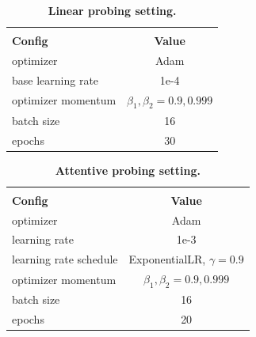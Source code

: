 \begin{table}[t]
    \caption{\textbf{Linear probing setting.}}
    \vspace{-1.5em}
    \begin{center}
    \small
        \begin{tabular}{l|c}
            \hline
            
            \hline
            
            \hline\\[-3mm]
            \textbf{Config} & \textbf{Value } \\
            \hline
            optimizer & Adam \\
            base learning rate & 1e-4 \\
            
            optimizer momentum & $\beta_1, \beta_2{=}0.9, 0.999$ \\
            batch size & 16 \\
            epochs  & 30 \\
            \hline 
            
            \hline
            
            \hline
        \end{tabular}
    \end{center}
\vspace{-1.2em}
\label{tab:hyperparams_lp}
\vspace{1.5em}
\end{table}


\begin{table}[t]
    \caption{\textbf{Attentive probing setting.}}
    \vspace{-1.5em}
    \begin{center}
    \small
        \begin{tabular}{l|c}
            \hline
            
            \hline
            
            \hline\\[-3mm]
            \textbf{Config} & \textbf{Value } \\
            \hline
            optimizer & Adam \\
            learning rate & 1e-3 \\
            learning rate schedule & ExponentialLR, $\gamma{=}0.9$ \\
            optimizer momentum & $\beta_1, \beta_2{=}0.9, 0.999$ \\
            batch size & 16 \\
            epochs  & 20 \\
            \hline 
            
            \hline
            
            \hline
        \end{tabular}
    \end{center}
\vspace{-1.2em}
\label{tab:hyperparams_ap}
\vspace{-0.5em}
\end{table}


